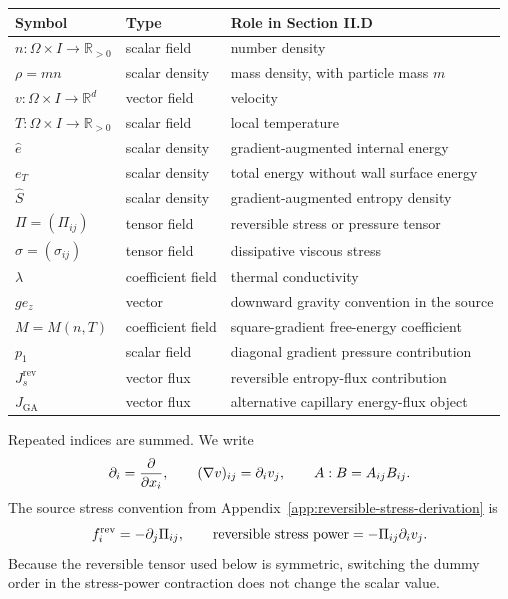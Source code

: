 \begin{center}
\begin{tabular}{@{}lll@{}}
\toprule
Symbol & Type & Role in Section II.D \\
\midrule
\(n:\Omega\times I\to\mathbb{R}_{>0}\) & scalar field & number density \\
\(\rho=mn\) & scalar density & mass density, with particle mass \(m\) \\
\(v:\Omega\times I\to\mathbb{R}^d\) & vector field & velocity \\
\(T:\Omega\times I\to\mathbb{R}_{>0}\) & scalar field & local temperature \\
\(\hat e\) & scalar density & gradient-augmented internal energy \\
\(e_T\) & scalar density & total energy without wall surface energy \\
\(\hat S\) & scalar density & gradient-augmented entropy density \\
\(\Pi=(\Pi_{ij})\) & tensor field & reversible stress or pressure tensor \\
\(\sigma=(\sigma_{ij})\) & tensor field & dissipative viscous stress \\
\(\lambda\) & coefficient field & thermal conductivity \\
\(g e_z\) & vector & downward gravity convention in the source \\
\(M=M(n,T)\) & coefficient field & square-gradient free-energy coefficient \\
\(p_1\) & scalar field & diagonal gradient pressure contribution \\
\(J_s^{\mathrm{rev}}\) & vector flux & reversible entropy-flux contribution \\
\(J_{\mathrm{GA}}\) & vector flux & alternative capillary energy-flux object \\
\bottomrule
\end{tabular}
\end{center}

Repeated indices are summed.  We write
\[
  \partial_i=\frac{\partial}{\partial x_i},
  \qquad
  (\nabla v)_{ij}=\partial_i v_j,
  \qquad
  A:B=A_{ij}B_{ij}.
\]
The source stress convention from Appendix~\ref{app:reversible-stress-derivation}
is
\[
  f_i^{\mathrm{rev}}=-\partial_j\Pi_{ij},
  \qquad
  \hbox{reversible stress power}=-\Pi_{ij}\partial_i v_j .
\]
Because the reversible tensor used below is symmetric, switching the dummy
order in the stress-power contraction does not change the scalar value.

